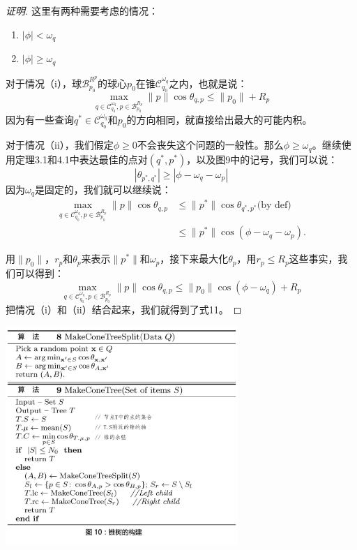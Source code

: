 \documentclass[twocolumn]{article}
\begin{document}
\begin{proof}[证明]
这里有两种需要考虑的情况：
\begin{enumerate}[label={\roman*}]
\item $|\phi| < \omega_q$
\item $|\phi| \ge \omega_q$
\end{enumerate}
对于情况（i），球$\mathcal{B}_{p_0}^{R^p}$的球心$p_0$在锥$\mathcal{C}_{q_0}^{\omega_q}$之内，也就是说：
\begin{equation}
\max_{q\in\mathcal{C}_{q_0}^{\omega_q},p\in\mathcal{B}_{p_0}^{R_p}}\|p\|\cos\theta_{q,p} \le \|p_0\| + R_p
\end{equation}
因为有一些查询$q^*\in\mathcal{C}_{q_0}^{\omega_q}$和$p_0$的方向相同，就直接给出最大的可能内积。

对于情况（ii），我们假定$\phi\ge0$不会丧失这个问题的一般性。那么$\phi\ge\omega_q$。继续使用定理3.1和4.1中表达最佳的点对$(q^*,p^*)$，以及图9中的记号，我们可以说：
\begin{equation}
|\theta_{p^*,q^*}| \ge | \phi - \omega_q - \omega_p |
\end{equation}
因为$\omega_q$是固定的，我们就可以继续说：
\begin{equation}
\begin{aligned}
\max_{q\in\mathcal{C}_{q_0}^{\omega_q},p\in\mathcal{B}_{p_0}^{R_p}} \|p\|\cos\theta_{q,p} & \le \|p^*\|\cos\theta_{q^*,p^*}\text{(by def)} \\
& \le \|p^*\|\cos(\phi - \omega_q - \omega_p).
\end{aligned}
\end{equation}

用$\|p_0\|$，$r_p$和$\theta_p$来表示$\|p^*\|$和$\omega_p$，接下来最大化$\theta_p$，用$r_p \le R_p$这些事实，我们可以得到：
\begin{equation}
\max_{q\in\mathcal{C}_{q_0}^{\omega_q},p\in\mathcal{B}_{p_0}^{R_p}} \|p\|\cos\theta_{q,p} \le \|p_0\|\cos(\phi - \omega_q) + R_p
\end{equation}
把情况（i）和（ii）结合起来，我们就得到了式11。
\end{proof}

\includegraphics[width=250pt,clip,trim=10 0 -10 0]{fig10.jpg}
\end{document}
